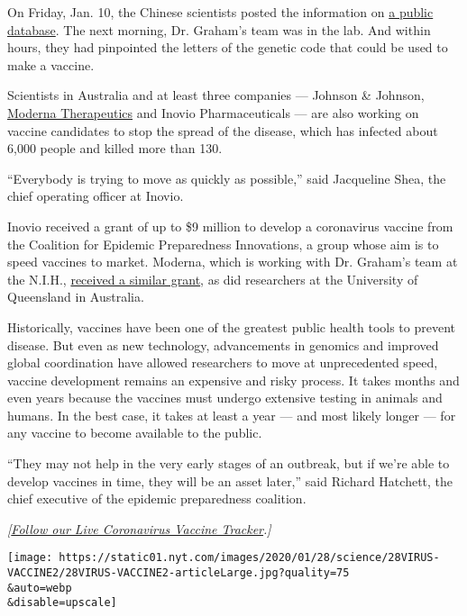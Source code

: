 On Friday, Jan. 10, the Chinese scientists posted the information on
\href{https://www.ncbi.nlm.nih.gov/nuccore/MN908947}{a public database}.
The next morning, Dr. Graham's team was in the lab. And within hours,
they had pinpointed the letters of the genetic code that could be used
to make a vaccine.

Scientists in Australia and at least three companies --- Johnson \&
Johnson,
\href{https://www.nytimes.com/2020/05/18/health/coronavirus-vaccine-moderna.html}{Moderna
Therapeutics} and Inovio Pharmaceuticals --- are also working on vaccine
candidates to stop the spread of the disease, which has infected about
6,000 people and killed more than 130.

``Everybody is trying to move as quickly as possible,'' said Jacqueline
Shea, the chief operating officer at Inovio.

Inovio received a grant of up to \$9 million to develop a coronavirus
vaccine from the Coalition for Epidemic Preparedness Innovations, a
group whose aim is to speed vaccines to market. Moderna, which is
working with Dr. Graham's team at the N.I.H.,
\href{https://cepi.net/news_cepi/cepi-to-fund-three-programmes-to-develop-vaccines-against-the-novel-coronavirus-ncov-2019/}{received
a similar grant}, as did researchers at the University of Queensland in
Australia.

Historically, vaccines have been one of the greatest public health tools
to prevent disease. But even as new technology, advancements in genomics
and improved global coordination have allowed researchers to move at
unprecedented speed, vaccine development remains an expensive and risky
process. It takes months and even years because the vaccines must
undergo extensive testing in animals and humans. In the best case, it
takes at least a year --- and most likely longer --- for any vaccine to
become available to the public.

``They may not help in the very early stages of an outbreak, but if
we're able to develop vaccines in time, they will be an asset later,''
said Richard Hatchett, the chief executive of the epidemic preparedness
coalition.

\emph{{[}}\href{https://www.nytimes.com/interactive/2020/science/coronavirus-vaccine-tracker.html}{\emph{Follow
our Live Coronavirus Vaccine Tracker}}\emph{.{]}}

\texttt{[image: https://static01.nyt.com/images/2020/01/28/science/28VIRUS-VACCINE2/28VIRUS-VACCINE2-articleLarge.jpg?quality=75\\\&auto=webp\\\&disable=upscale]}

